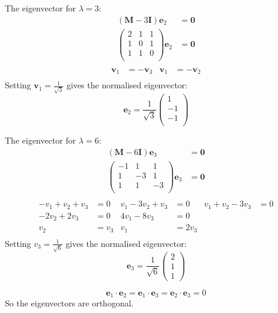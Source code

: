 \documentclass[10pt,oneside,a4paper]{article}
\begin{document}
\begin{enumerate}
\begin{enumerate}[label=(\roman*)]
The eigenvector for $\lambda = 3$:
\[
\begin{split}
(\mathbf{M} - 3\mathbf{I})\mathbf{e}_2 &= \mathbf{0} \\
\begin{pmatrix}
2 & 1 & 1 \\
1 & 0 & 1 \\
1 & 1 & 0 \\
\end{pmatrix}
\mathbf{e}_2 &= \mathbf{0} \\
\end{split}
\]
\begin{align*}
\mathbf{v}_1 &= -\mathbf{v}_3 & \mathbf{v}_1 &= -\mathbf{v}_2 \\
\end{align*}
Setting $\mathbf{v}_1 = \frac{1}{\sqrt {3}}$ gives the normalised eigenvector:
\[
\mathbf{e}_2 =
\frac{1}{\sqrt {3}}
\begin{pmatrix}
1 \\ -1 \\ -1 \\
\end{pmatrix}
\]

The eigenvector for $\lambda = 6$:
\[
\begin{split}
(\mathbf{M} - 6\mathbf{I})\mathbf{e}_3 &= \mathbf{0} \\
\begin{pmatrix}
-1 & 1 & 1 \\
1 & -3 & 1 \\
1 & 1 & -3 \\
\end{pmatrix}
\mathbf{e}_3 &= \mathbf{0} \\
\end{split}
\]
\begin{align*}
-v_1 + v_2 + v_3 &= 0 & v_1 -3v_2 + v_3 &= 0 & v_1 + v_2 - 3v_3 &= 0 \\
-2v_2 + 2v_3 &= 0 & 4v_1 - 8v_3 &= 0 \\
v_2 &= v_3 & v_1 &= 2v_3 \\
\end{align*}
Setting $v_3 = \frac{1}{\sqrt {6}}$ gives the normalised eigenvector:
\[
\mathbf{e}_3 =
\frac{1}{\sqrt {6}}
\begin{pmatrix}
2 \\ 1 \\ 1
\end{pmatrix}
\]

\[
\mathbf{e}_1 \cdot \mathbf{e}_2 = \mathbf{e}_1 \cdot \mathbf{e}_3 = \mathbf{e}_2 \cdot \mathbf{e}_3 = 0
\]
So the eigenvectors are orthogonal.


\end{enumerate}
\end{enumerate}
\end{document}

